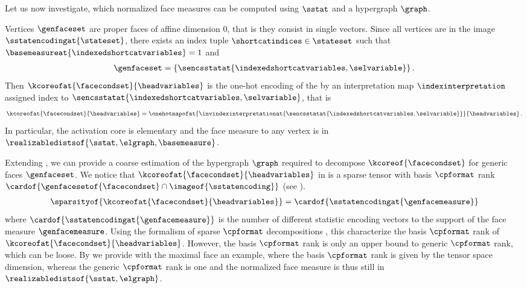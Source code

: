 %
Let us now investigate, which normalized face measures can be computed using $\sstat$ and a hypergraph $\graph$.

\begin{example}[Vertices]
    \label{exa:vertexMeasures}
    Vertices $\genfaceset$ are proper faces of affine dimension $0$, that is they consist in single vectors.
    Since all vertices are in the image $\sstatencodingat{\stateset}$, there exists an index tuple $\shortcatindices\in\stateset$ such that $\basemeasureat{\indexedshortcatvariables}=1$ and
    \begin{align*}
        \genfaceset = \{\sencsstatat{\indexedshortcatvariables,\selvariable}\} \, .
    \end{align*}
    Then $\kcoreofat{\facecondset}{\headvariables}$ is the one-hot encoding of the by an interpretation map $\indexinterpretation$ assigned index to $\sencsstatat{\indexedshortcatvariables,\selvariable}$, that is
    \begin{align*}
        \kcoreofat{\facecondset}{\headvariables} = \onehotmapofat{\invindexinterpretationat{\sencsstatat{\indexedshortcatvariables,\selvariable}}}{\headvariables} \, .
    \end{align*}
    In particular, the activation core is elementary and the face measure to any vertex is in $\realizabledistsof{\sstat,\elgraph,\basemeasure}$.
\end{example}


Extending , we can provide a coarse estimation of the hypergraph $\graph$ required to decompose $\kcoreof{\facecondset}$ for generic faces $\genfaceset$.
We notice that $\kcoreofat{\facecondset}{\headvariables}$ in  is a sparse tensor with basis $\cpformat$ rank $\cardof{\genfacesetof{\facecondset}\cap\imageof{\sstatencoding}}$ (see ).
\begin{align*}
    \sparsityof{\kcoreofat{\facecondset}{\headvariables}}
    = \cardof{
        \sstatencodingat{\genfacemeasure}
    }
\end{align*}
where $\cardof{\sstatencodingat{\genfacemeasure}}$ is the number of different statistic encoding vectors to the support of the face measure $\genfacemeasure$.
Using the formalism of sparse $\cpformat$ decompositions , this characterize the basis $\cpformat$ rank of $\kcoreofat{\facecondset}{\headvariables}$.
However, the basis $\cpformat$ rank is only an upper bound to generic $\cpformat$ rank, which can be loose.
By  we provide with the maximal face an example, where the basis $\cpformat$ rank is given by the tensor space dimension, whereas the generic $\cpformat$ rank is one and the normalized face measure is thus still in $\realizabledistsof{\sstat,\elgraph}$.


